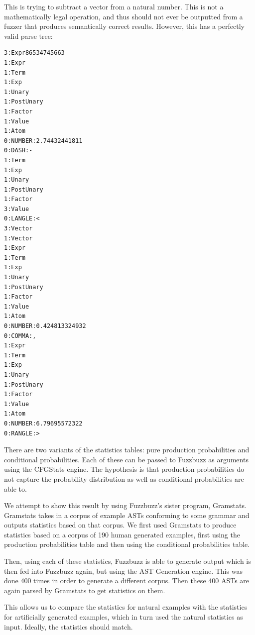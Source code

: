 This is trying to subtract a vector from a natural number. This is not a
mathematically legal operation, and thus should not ever be outputted from a
fuzzer that produces semantically correct results. However, this has a
perfectly valid parse tree:

\begin{verbatim}
3:Expr86534745663
1:Expr
1:Term
1:Exp
1:Unary
1:PostUnary
1:Factor
1:Value
1:Atom
0:NUMBER:2.74432441811
0:DASH:-
1:Term
1:Exp
1:Unary
1:PostUnary
1:Factor
3:Value
0:LANGLE:<
3:Vector
1:Vector
1:Expr
1:Term
1:Exp
1:Unary
1:PostUnary
1:Factor
1:Value
1:Atom
0:NUMBER:0.424813324932
0:COMMA:,
1:Expr
1:Term
1:Exp
1:Unary
1:PostUnary
1:Factor
1:Value
1:Atom
0:NUMBER:6.79695572322
0:RANGLE:>
\end{verbatim}


There are two variants of the statistics tables: pure production probabilities
and conditional probabilities. Each of these can be passed to Fuzzbuzz as
arguments using the CFGStats engine. The hypothesis is that production
probabilities do not capture the probability distribution as well as
conditional probabilities are able to.

We attempt to show this result by using Fuzzbuzz's sister program, Gramstats.
Gramstats takes in a corpus of example ASTs conforming to some grammar and
outputs statistics based on that corpus. We first used Gramstats to produce
statistics based on a corpus of 190 human generated examples, first using the
production probabilities table and then using the conditional probabilities
table.

Then, using each of these statistics, Fuzzbuzz is able to generate output which
is then fed into Fuzzbuzz again, but using the AST Generation engine. This was
done 400 times in order to generate a different corpus. Then these 400 ASTs are
again parsed by Gramstats to get statistics on them.

This allows us to compare the statistics for natural examples with the
statistics for artificially generated examples, which in turn used the natural
statistics as input. Ideally, the statistics should match.


